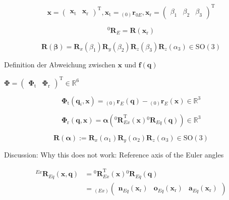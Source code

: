 \documentclass[twocolumn,10pt]{IFTOMM}
\newcommand{\bm}[1]{\boldsymbol{#1}}
\newcommand{\ortvek}[4]{{ }_{(#1)}{\boldsymbol{#2}}^{#3}_{#4} }
\newcommand{\vek}[3]{\boldsymbol{#1}^{#2}_{#3}}
\newcommand{\rotmat}[2]{{{ }^{#1}\boldsymbol{R}}_{#2}}
\newcommand{\transp}[0]{{\mathrm{T}}}
\begin{document}
\begin{equation}
\bm{x}
=
\begin{pmatrix}
\bm{x}_{\mathrm{t}} & \bm{x}_{\mathrm{r}}
\end{pmatrix}^\transp
, 
\bm{x}_{\mathrm{t}}
=
\ortvek{0}{r}{}{0E}
,
\bm{x}_{\mathrm{r}}
=
\begin{pmatrix}
\beta_1  & \beta_2 & \beta_3
\end{pmatrix}^{\mathrm{T}}
\end{equation}  


\begin{equation}
\rotmat{0}{E}=\bm{R}(\bm{x}_{\mathrm{r}})
\end{equation}  


\begin{equation}
\bm{R}(\bm{\beta}) = \bm{R}_x(\beta_1) \bm{R}_y(\beta_2) \bm{R}_z(\beta_3) \bm{R}_z(\alpha_3) \in \mathrm{SO(3)}
\end{equation}

Definition der Abweichung zwischen $\bm{x}$ und $\bm{f}(\bm{q})$

$\bm{\Phi}=\begin{pmatrix}
\bm{\Phi}_{\mathrm{t}} & \bm{\Phi}_{\mathrm{r}}
\end{pmatrix}^\transp \in {\mathbb{R}}^{6}$

\begin{equation}
\bm{\Phi}_{\mathrm{t}}(\bm{q}_i,\bm{x}) = \ortvek{0}{r}{}{E}(\bm{q}) - \ortvek{0}{r}{}{E}(\bm{x}) \in {\mathbb{R}}^{3}
\end{equation}

\cite{GoldenbergBenFen1985}

\begin{equation}
\bm{\Phi}_{\mathrm{r}}(\bm{q},\bm{x}) = \bm{\alpha}\left(\rotmat{0}{Ex}^\transp (\bm{x})\rotmat{0}{Eq}(\bm{q})\right) \in {\mathbb{R}}^{3}
\end{equation}


\begin{equation}
\bm{R}(\bm{\alpha}) := \bm{R}_x(\alpha_1) \bm{R}_y(\alpha_2) \bm{R}_z(\alpha_3) \in \mathrm{SO(3)}
\end{equation}

Discussion: Why this does not work: Reference axis of the Euler angles


\begin{align}
\rotmat{Ex}{Eq}(\bm{x},\bm{q}) 
& = \rotmat{0}{Ex}^\transp (\bm{x})\rotmat{0}{Eq}(\bm{q}) \\
&={}_{(Ex)}\begin{pmatrix}
\vek{n}{}{Eq}(\bm{x}_{\mathrm{r}}) & \vek{o}{}{Eq}(\bm{x}_{\mathrm{r}}) & \vek{a}{}{Eq}(\bm{x}_{\mathrm{r}})
\end{pmatrix}
\end{align}
\end{document}
